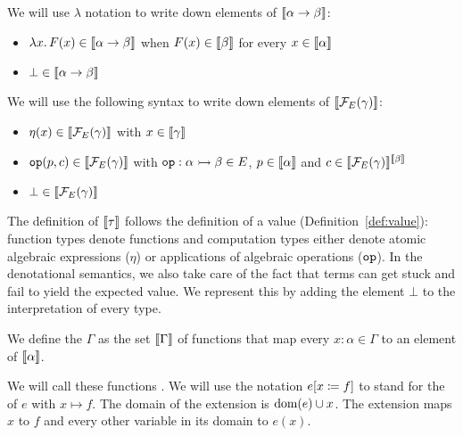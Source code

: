 \begin{notation}
  We will use $\lambda$ notation to write down elements of
  $\llbracket \alpha \to \beta \rrbracket$:
  
  \begin{itemize}
  \item $\lambda x.\, F(x) \in \llbracket \alpha \to \beta \rrbracket$ when
    $F(x) \in \llbracket \beta \rrbracket$ for every $x \in \llbracket \alpha \rrbracket$
  \item $\bot \in \llbracket \alpha \to \beta \rrbracket$
  \end{itemize}

  We will use the following syntax to write down elements of
  $\llbracket \mathcal{F}_E(\gamma) \rrbracket$:
  
  \begin{itemize}
  \item $\eta(x) \in \llbracket \mathcal{F}_E(\gamma) \rrbracket$ with $x \in \llbracket \gamma \rrbracket$
  \item $\mathtt{op}(p,c) \in \llbracket \mathcal{F}_E(\gamma) \rrbracket$ with
    $\mathtt{op} : \alpha \rightarrowtail \beta \in E$, $p \in \llbracket \alpha \rrbracket$ and
    $c \in \llbracket \mathcal{F}_E(\gamma) \rrbracket^{\llbracket \beta \rrbracket}$
  \item $\bot \in \llbracket \mathcal{F}_E(\gamma) \rrbracket$
  \end{itemize}
\end{notation}

The definition of $\llbracket \tau \rrbracket$ follows the definition of a value
(Definition~\ref{def:value}): function types denote functions and
computation types either denote atomic algebraic expressions ($\eta$) or
applications of algebraic operations ($\mathtt{op}$). In the denotational
semantics, we also take care of the fact that terms can get stuck and fail
to yield the expected value. We represent this by adding the element $\bot$
to the interpretation of every type.

\begin{definition}
  We define the  $\Gamma$
  as the set $\llbracket \Gamma \rrbracket$ of functions that map every
  $x : \alpha \in \Gamma$ to an element of $\llbracket \alpha \rrbracket$.
  
  We will call these functions . We will use the notation
  $e[x \coloneqq f]$ to stand for the  of $e$ with
  $x \mapsto f$. The domain of the extension is $\operatorname{dom}(e) \cup x$. The
  extension maps $x$ to $f$ and every other variable in its domain to
  $e(x)$.
\end{definition}

